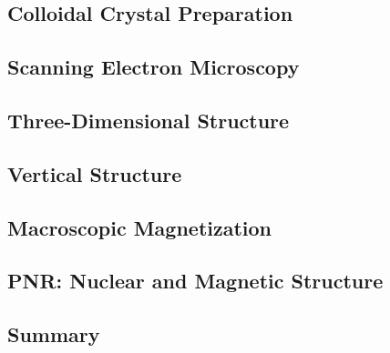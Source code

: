 \documentclass[\main/dresen_thesis.tex]{subfiles}
\renewcommand{\thisPath}{\main/chapters/colloidalCrystals/colloidalCrystals}
\begin{document}
  \subsection{Colloidal Crystal Preparation}
  
    \FloatBarrier

  \subsection{Scanning Electron Microscopy}
  
    \FloatBarrier

  \subsection{Three-Dimensional Structure}
  
    \FloatBarrier

  \subsection{Vertical Structure}
  
    \FloatBarrier

  \subsection{Macroscopic Magnetization}
  
    \FloatBarrier

  \subsection{PNR: Nuclear and Magnetic Structure}
  
    \FloatBarrier

  \clearpage
  \subsection{Summary}
  
    \FloatBarrier
\end{document}
